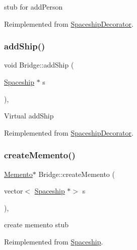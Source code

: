 stub for add\+Person 

Reimplemented from \hyperlink{classSpaceshipDecorator_a6e289d8a65f35b9f223255ae0eaa3b00}{Spaceship\+Decorator}.

\mbox{\label{classBridge_a49676496d07502909958e747ef4c3214}} 
\subsubsection{\texorpdfstring{add\+Ship()}{addShip()}}
{\footnotesize\ttfamily void Bridge\+::add\+Ship (\begin{DoxyParamCaption}\item[{\hyperlink{classSpaceship}{Spaceship} $\ast$}]{s }\end{DoxyParamCaption})\hspace{0.3cm}{\ttfamily [inline]}, {\ttfamily [virtual]}}

Virtual add\+Ship 

Reimplemented from \hyperlink{classSpaceshipDecorator_a5ed39419f5fab65dd4af11bf5136f7a4}{Spaceship\+Decorator}.

\mbox{\label{classBridge_ae6e139b786743b19ec4f1762283b6fc1}} 
\subsubsection{\texorpdfstring{create\+Memento()}{createMemento()}}
{\footnotesize\ttfamily \hyperlink{classMemento}{Memento}$\ast$ Bridge\+::create\+Memento (\begin{DoxyParamCaption}\item[{vector$<$ \hyperlink{classSpaceship}{Spaceship} $\ast$$>$}]{s }\end{DoxyParamCaption})\hspace{0.3cm}{\ttfamily [inline]}, {\ttfamily [virtual]}}

create memento stub 

Reimplemented from \hyperlink{classSpaceship_a6d272f846b019dec8226ddab65648a7b}{Spaceship}.

\mbox{\label{classBridge_a512402725d1a095497191968edc18555}} 
